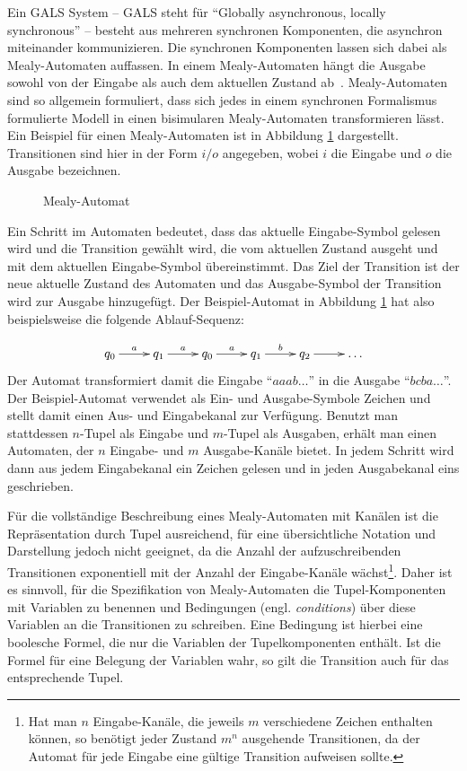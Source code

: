 Ein GALS System -- GALS steht für "`Globally asynchronous, locally synchronous"' -- besteht aus mehreren synchronen Komponenten, die asynchron miteinander kommunizieren.
Die synchronen Komponenten lassen sich dabei als Mealy-Automaten auffassen.
In einem Mealy-Automaten hängt die Ausgabe sowohl von der Eingabe als auch dem aktuellen Zustand ab~\cite{Mealy}.
Mealy-Automaten sind so allgemein formuliert, dass sich jedes in einem synchronen Formalismus formulierte Modell in einen bisimularen Mealy-Automaten transformieren lässt.
Ein Beispiel für einen Mealy-Automaten ist in Abbildung \ref{fig:mealy} dargestellt.
Transitionen sind hier in der Form $i/o$ angegeben, wobei $i$ die Eingabe und $o$ die Ausgabe bezeichnen.
\begin{figure}[h]
  \centering
  
  \caption{Mealy-Automat}
  \label{fig:mealy}
\end{figure}

Ein Schritt im Automaten bedeutet, dass das aktuelle Eingabe-Symbol gelesen wird und die Transition gewählt wird, die vom aktuellen Zustand ausgeht und mit dem aktuellen Eingabe-Symbol übereinstimmt.
Das Ziel der Transition ist der neue aktuelle Zustand des Automaten und das Ausgabe-Symbol der Transition wird zur Ausgabe hinzugefügt.
Der Beispiel-Automat in Abbildung \ref{fig:mealy} hat also beispielsweise die folgende Ablauf-Sequenz:

\[ \xymatrix {
     q_0\ar[r]^a &  q_1 \ar[r]^a & q_0 \ar[r]^a & q_1 \ar[r]^b & q_2\ar[r] & \dots
   } \]
Der Automat transformiert damit die Eingabe "`$aaab\dots$"' in die Ausgabe "`$bcba\dots$"'.
Der Beispiel-Automat verwendet als Ein- und Ausgabe-Symbole Zeichen und stellt damit einen Aus- und Eingabekanal zur Verfügung.
Benutzt man stattdessen $n$-Tupel als Eingabe und $m$-Tupel als Ausgaben, erhält man einen Automaten, der $n$ Eingabe- und $m$ Ausgabe-Kanäle bietet.
In jedem Schritt wird dann aus jedem Eingabekanal ein Zeichen gelesen und in jeden Ausgabekanal eins geschrieben.

Für die vollständige Beschreibung eines Mealy-Automaten mit Kanälen ist die Repräsentation durch Tupel ausreichend, für eine übersichtliche Notation und Darstellung jedoch nicht geeignet, da die Anzahl der aufzuschreibenden Transitionen exponentiell mit der Anzahl der Eingabe-Kanäle wächst\footnote{Hat man $n$ Eingabe-Kanäle, die jeweils $m$ verschiedene Zeichen enthalten können, so benötigt jeder Zustand $m^n$ ausgehende Transitionen, da der Automat für jede Eingabe eine gültige Transition aufweisen sollte.}.
Daher ist es sinnvoll, für die Spezifikation von Mealy-Automaten die Tupel-Komponenten mit Variablen zu benennen und Bedingungen (engl. \emph{conditions}) über diese Variablen an die Transitionen zu schreiben.
Eine Bedingung ist hierbei eine boolesche Formel, die nur die Variablen der Tupelkomponenten enthält.
Ist die Formel für eine Belegung der Variablen wahr, so gilt die Transition auch für das entsprechende Tupel.

